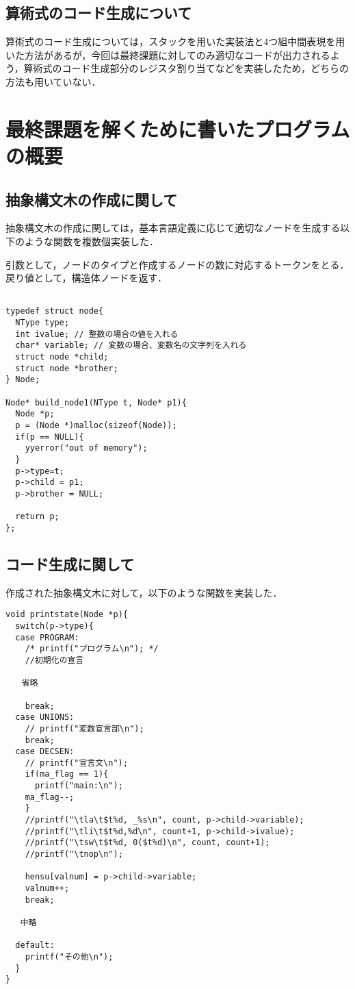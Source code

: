 \documentclass[a4j]{jarticle}
\begin{document}
\subsection{算術式のコード生成について}
算術式のコード生成については，スタックを用いた実装法と4つ組中間表現を用いた方法があるが，今回は最終課題に対してのみ適切なコードが出力されるよう，算術式のコード生成部分のレジスタ割り当てなどを実装したため，どちらの方法も用いていない．

\section{最終課題を解くために書いたプログラムの概要}

\subsection{抽象構文木の作成に関して}

抽象構文木の作成に関しては，基本言語定義に応じて適切なノードを生成する以下のような関数を複数個実装した．

引数として，ノードのタイプと作成するノードの数に対応するトークンをとる．
戻り値として，構造体ノードを返す．

\begin{verbatim}

typedef struct node{
  NType type;
  int ivalue; // 整数の場合の値を入れる
  char* variable; // 変数の場合、変数名の文字列を入れる
  struct node *child;
  struct node *brother;
} Node;

Node* build_node1(NType t, Node* p1){
  Node *p;
  p = (Node *)malloc(sizeof(Node));
  if(p == NULL){
    yyerror("out of memory");
  }
  p->type=t;
  p->child = p1;
  p->brother = NULL;

  return p;
};
\end{verbatim}

\subsection{コード生成に関して}

作成された抽象構文木に対して，以下のような関数を実装した．

\begin{verbatim}
void printstate(Node *p){
  switch(p->type){
  case PROGRAM:
    /* printf("プログラム\n"); */
    //初期化の宣言

　　省略

    break;
  case UNIONS:
    // printf("変数宣言部\n");
    break;
  case DECSEN:
    // printf("宣言文\n");
    if(ma_flag == 1){
      printf("main:\n");
    ma_flag--;
    }
    //printf("\tla\t$t%d, _%s\n", count, p->child->variable);
    //printf("\tli\t$t%d,%d\n", count+1, p->child->ivalue);
    //printf("\tsw\t$t%d, 0($t%d)\n", count, count+1);
    //printf("\tnop\n");

    hensu[valnum] = p->child->variable;
    valnum++;    
    break;

   中略

  default:
    printf("その他\n");
  }
}

\end{verbatim}
\end{document}
